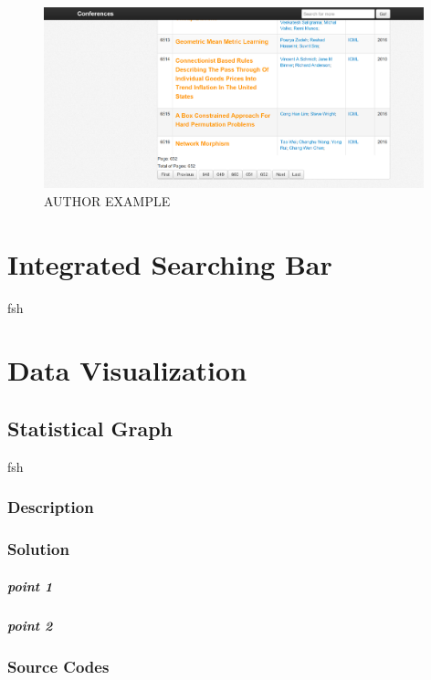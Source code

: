 \documentclass{book}
\begin{document}
\begin{figure}[b]
\centering
\includegraphics[width=11.0cm]{img/dsw_con.png}
\caption{AUTHOR EXAMPLE}
\label{pict:dsw2}
\end{figure}

\chapter {Integrated Searching Bar}

fsh


\chapter {Data Visualization}


\section {Statistical Graph}

fsh

\subsection{Description}

\subsection{Solution}

\paragraph{point 1}

\paragraph{point 2}

\subsection{Source Codes}
\end{document}
